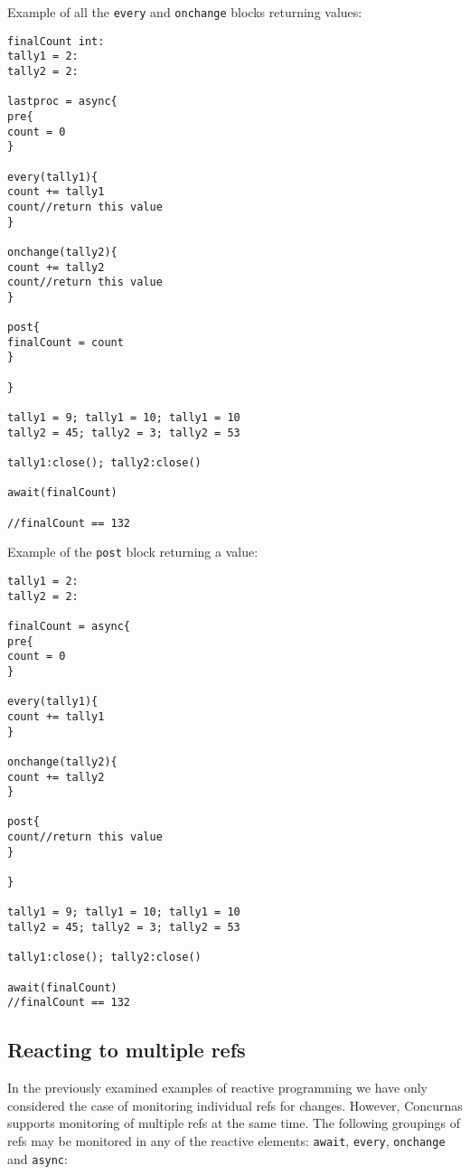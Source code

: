 \documentclass[conc-doc]{subfiles}
\begin{document}
Example of all the \lstinline{every} and \lstinline{onchange} blocks returning values:
\begin{lstlisting}
finalCount int:
tally1 = 2:
tally2 = 2:

lastproc = async{
pre{
count = 0
}

every(tally1){
count += tally1
count//return this value
}		

onchange(tally2){
count += tally2		
count//return this value
}

post{
finalCount = count
}

}

tally1 = 9; tally1 = 10; tally1 = 10
tally2 = 45; tally2 = 3; tally2 = 53

tally1:close(); tally2:close()

await(finalCount)

//finalCount == 132
\end{lstlisting}


Example of the \lstinline{post} block returning a value:
\begin{lstlisting}
tally1 = 2:
tally2 = 2:

finalCount = async{
pre{
count = 0
}

every(tally1){
count += tally1
}		

onchange(tally2){
count += tally2		
}

post{
count//return this value
}

}

tally1 = 9; tally1 = 10; tally1 = 10
tally2 = 45; tally2 = 3; tally2 = 53

tally1:close(); tally2:close()

await(finalCount)
//finalCount == 132
\end{lstlisting}


\subsection{Reacting to multiple refs}
In the previously examined examples of reactive programming we have only considered the case of monitoring individual refs for changes. However, Concurnas supports monitoring of multiple refs at the same time. The following groupings of refs may be monitored in any of the reactive elements: \lstinline{await}, \lstinline{every}, \lstinline{onchange} and \lstinline{async}:
\end{document}
